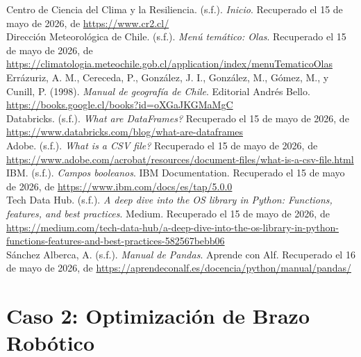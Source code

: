 \documentclass[12pt]{article}
\begin{document}
\noindent Centro de Ciencia del Clima y la Resiliencia. (s.f.). \textit{Inicio}. Recuperado el 15 de mayo de 2026, de \url{https://www.cr2.cl/} \\

\noindent Dirección Meteorológica de Chile. (s.f.). \textit{Menú temático: Olas}. Recuperado el 15 de mayo de 2026, de \url{https://climatologia.meteochile.gob.cl/application/index/menuTematicoOlas} \\

\noindent Errázuriz, A. M., Cereceda, P., González, J. I., González, M., Gómez, M., y Cunill, P. (1998). \textit{Manual de geografía de Chile}. Editorial Andrés Bello. \url{https://books.google.cl/books?id=oXGaJKGMaMgC} \\

\noindent Databricks. (s.f.). \textit{What are DataFrames?} Recuperado el 15 de mayo de 2026, de \url{https://www.databricks.com/blog/what-are-dataframes} \\

\noindent Adobe. (s.f.). \textit{What is a CSV file?} Recuperado el 15 de mayo de 2026, de \url{https://www.adobe.com/acrobat/resources/document-files/what-is-a-csv-file.html} \\

\noindent IBM. (s.f.). \textit{Campos booleanos}. IBM Documentation. Recuperado el 15 de mayo de 2026, de \url{https://www.ibm.com/docs/es/tap/5.0.0} \\

\noindent Tech Data Hub. (s.f.). \textit{A deep dive into the OS library in Python: Functions, features, and best practices}. Medium. Recuperado el 15 de mayo de 2026, de \url{https://medium.com/tech-data-hub/a-deep-dive-into-the-os-library-in-python-functions-features-and-best-practices-582567bebb06} \\

\noindent Sánchez Alberca, A. (s.f.). \textit{Manual de Pandas}. Aprende con Alf. Recuperado el 16 de mayo de 2026, de \url{https://aprendeconalf.es/docencia/python/manual/pandas/} \\

\newpage
\section{Caso 2: Optimización de Brazo Robótico}
\end{document}
